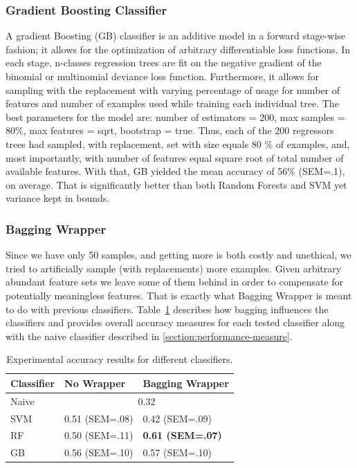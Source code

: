	\subsubsection{Gradient Boosting Classifier}
	A gradient Boosting (GB) classifier is an additive model in a forward stage-wise fashion; it allows for the optimization of arbitrary differentiable loss functions. In each stage, n-classes regression trees are fit on the negative gradient of the binomial or multinomial deviance loss function. Furthermore, it allows for sampling with the replacement with varying percentage of usage for number of features and number of examples used while training each individual tree. The best parameters for the model are: number of estimators = 200, max samples = 80$\%$, max features = sqrt, bootstrap = true. Thus, each of the 200 regressors trees had sampled, with replacement, set with size equals 80 $\%$ of examples, and, most importantly, with number of features equal square root of total number of available features. With that, GB yielded the mean accuracy of 56$\%$ (SEM=.1), on average. That is significantly better than both Random Forests and SVM yet variance kept in bounds. 
	
	\subsubsection{Bagging Wrapper}
	Since we have only 50 samples, and getting more is both costly and unethical, we tried to artificially sample (with replacements) more examples. Given arbitrary abundant feature sets we leave some of them behind in order to compensate for potentially meaningless features. That is exactly what Bagging Wrapper is meant to do with previous classifiers. Table~\ref{tab:ml-model-results} describes how bagging influences the classifiers and provides overall accuracy measures for each tested classifier along with the naive classifier described in \cref{section:performance-measure}. 
	
	\begin{table}[h]
		\centering
		\caption{Experimental accuracy results for different classifiers.}
		\label{tab:ml-model-results}
		\begin{tabular}{lll}
			\hline
			\abovespace\belowspace
			Classifier	& No Wrapper	& Bagging Wrapper \\
			\hline
			Naive & \multicolumn{2}{c}{0.32}\\
			SVM	 	& 0.51 (SEM=.08)	&	0.42 (SEM=.09)\\
			RF	&	0.50 (SEM=.11)	&  \textbf{0.61 (SEM=.07)}\\
			GB & 0.56 (SEM=.10)	& 0.57 (SEM=.10) \\	
			\hline
		\end{tabular}
	\end{table}
	
